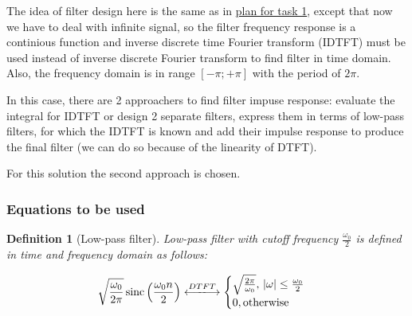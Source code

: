 \documentclass[a4paper]{article}
\theoremstyle{break}
\newtheorem{definition}{Definition}[section]
\theoremstyle{break}
\DeclarePairedDelimiter\abs{\lvert}{\rvert}
\DeclareMathOperator{\sinc}{sinc}
\begin{document}
The idea of filter design here is the same as in \hyperref[subsub:task_1_plan]{plan for task 1}, except that now we have to deal with infinite signal, so the filter frequency response is a continious function and inverse discrete time Fourier transform (IDTFT) must be used instead of inverse discrete Fourier transform to find filter in time domain. Also, the frequency domain is in range $\left[ -\pi; + \pi \right]$ with the period of $2 \pi$.

In this case, there are 2 approachers to find filter impuse response: evaluate the integral for IDTFT or design 2 separate filters, express them in terms of low-pass filters, for which the IDTFT is known and add their impulse response to produce the final filter (we can do so because of the linearity of DTFT).

For this solution the second approach is chosen.

\subsubsection*{Equations to be used}



\begin{definition}[Low-pass filter] \label{def:low_pass}
  Low-pass filter with \textit{cutoff} frequency $\frac{\omega_0}{2}$ is defined in time and frequency domain as follows:

  \begin{equation} \label{eq:low_pass}
    \sqrt{\frac{\omega_0}{2 \pi}} \sinc \left( \frac{\omega_0 n} {2} \right)
    \xlongleftrightarrow{DTFT}
    \begin{cases}
      \sqrt{\frac{2 \pi}{\omega_0}}, \, \abs{\omega} \leq \frac{\omega_0}{2} \\
      0, \text{otherwise}
    \end{cases}
  \end{equation}
\end{definition}
\end{document}
